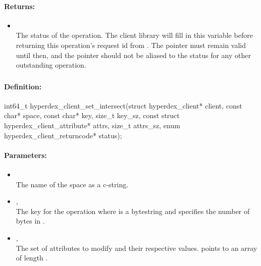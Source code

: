 \paragraph{Returns:}
\begin{itemize}[noitemsep]
\item {}\\
The status of the operation.  The client library will fill in this variable before returning this operation's request id from .  The pointer must remain valid until then, and the pointer should not be aliased to the status for any other outstanding operation.
\end{itemize}

\pagebreak
\subsubsection{}
\label{api:c:set_intersect}


\paragraph{Definition:}
\begin{ccode}
int64_t hyperdex_client_set_intersect(struct hyperdex_client* client,
        const char* space,
        const char* key, size_t key_sz,
        const struct hyperdex_client_attribute* attrs, size_t attrs_sz,
        enum hyperdex_client_returncode* status);
\end{ccode}

\paragraph{Parameters:}
\begin{itemize}[noitemsep]
\item {}\\
The name of the space as a c-string.
\item {}, \\
The key for the operation where  is a bytestring and  specifies the number of bytes in .
\item {}, \\
The set of attributes to modify and their respective values.   points to an array of length .
\end{itemize}

